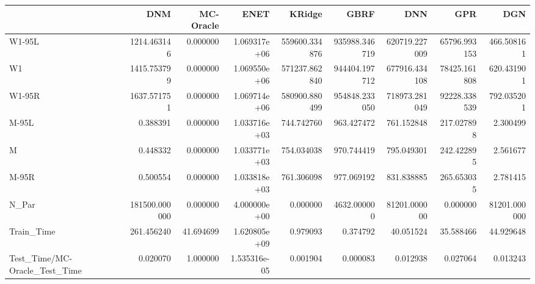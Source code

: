 \begin{tabular}{lrrrrrrrr}
\toprule
{} &            DNM &  MC-Oracle &          ENET &         KRidge &           GBRF &            DNN &           GPR &           DGN \\
\midrule
W1-95L                        &    1214.463146 &   0.000000 &  1.069317e+06 &  559600.334876 &  935988.346719 &  620719.227009 &  65796.993153 &    466.508161 \\
W1                            &    1415.753799 &   0.000000 &  1.069550e+06 &  571237.862840 &  944404.197712 &  677916.434108 &  78425.161808 &    620.431901 \\
W1-95R                        &    1637.571751 &   0.000000 &  1.069714e+06 &  580900.880499 &  954848.233050 &  718973.281049 &  92228.338539 &    792.035201 \\
M-95L                         &       0.388391 &   0.000000 &  1.033716e+03 &     744.742760 &     963.427472 &     761.152848 &    217.027898 &      2.300499 \\
M                             &       0.448332 &   0.000000 &  1.033771e+03 &     754.034038 &     970.744419 &     795.049301 &    242.422895 &      2.561677 \\
M-95R                         &       0.500554 &   0.000000 &  1.033818e+03 &     761.306098 &     977.069192 &     831.838885 &    265.653035 &      2.781415 \\
N\_Par                         &  181500.000000 &   0.000000 &  4.000000e+00 &       0.000000 &    4632.000000 &   81201.000000 &      0.000000 &  81201.000000 \\
Train\_Time                    &     261.456240 &  41.694699 &  1.620805e+09 &       0.979093 &       0.374792 &      40.051524 &     35.588466 &     44.929648 \\
Test\_Time/MC-Oracle\_Test\_Time &       0.020070 &   1.000000 &  1.535316e-05 &       0.001904 &       0.000083 &       0.012938 &      0.027064 &      0.013243 \\
\bottomrule
\end{tabular}
